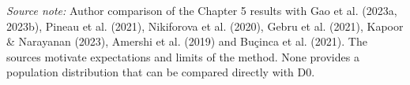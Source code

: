 \begin{table}[p]
  \caption{How the results compare with the literature (qualitative, not a non-anomaly test)}
  \label{tab:disc-literature-result-alignment}

  \vspace{4pt}
  \parbox{\textwidth}{\scriptsize
    \textit{Source note:} Author comparison of the Chapter 5 results with Gao et al. (2023a, 2023b),
    Pineau et al. (2021), Nikiforova et al. (2020), Gebru et al. (2021), Kapoor \& Narayanan (2023),
    Amershi et al. (2019) and Bu\c{c}inca et al. (2021). The sources motivate expectations and
    limits of the method. None provides a population distribution that can be compared directly with D0.}
\end{table}
\clearpage
